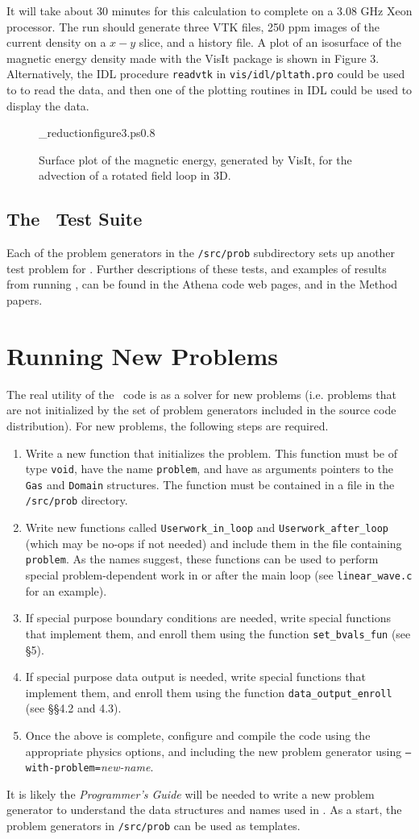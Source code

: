 It will take about 30 minutes for this calculation to complete on a 3.08 GHz
Xeon processor.  The run should generate three VTK files, 250 ppm
images of the current density on a $x-y$ slice, and a history file.
A plot of an isosurface
 of the magnetic energy density made with the VisIt package is
shown in Figure 3.  Alternatively, the IDL procedure {\tt readvtk}
in {\tt vis/idl/pltath.pro} could be used to to read the data, and then one
of the plotting routines in IDL could be used to display the data.

\begin{figure}[htb!]
\plotone_reduction{figure3.ps}{0.8}
\caption{Surface plot of the magnetic energy, generated by VisIt, for
the advection of a rotated field loop in 3D.}
\end{figure}

\subsection{The \ath\ Test Suite}

Each of the problem generators in the {\tt /src/prob} subdirectory sets
up another test problem for \ath.  Further descriptions of these tests, and
examples of results from running \ath, can be found in the Athena code 
web pages, and in the Method papers.
  
\section{Running New Problems}

The real utility of the \ath\ code is as a solver for new problems
(i.e. problems that
are not initialized by the set of problem generators included in the source
code distribution).  For new problems, the following steps are required.
\begin{enumerate}
\item Write a new function that initializes the problem.  This function must
be of type {\tt void}, have the name {\tt problem}, and have as arguments
pointers to the {\tt Gas} and {\tt Domain} structures.
The function must be contained in a file in the {\tt /src/prob} directory.
\item Write new functions called {\tt Userwork\_in\_loop} and 
{\tt Userwork\_after\_loop} (which may be no-ops if not needed) and include
them in the file containing {\tt problem}.  As the names suggest, these
functions can be used to perform special problem-dependent work in or 
after the main loop (see {\tt linear\_wave.c} for an example).
\item If special purpose boundary conditions are needed, write special
functions that implement them, and enroll them using the function
{\tt set\_bvals\_fun} (see \S 5).
\item If special purpose data output is needed, write special
functions that implement them, and enroll them using the function
{\tt data\_output\_enroll} (see \S\S 4.2 and 4.3).
\item Once the above is complete, configure and compile the code
using the appropriate physics options, and including the new problem
generator using {\tt --with-problem=}{\em new-name}.
\end{enumerate}

It is likely the {\em Programmer's Guide} will be needed to write a 
new problem generator to understand the data structures and names used
in \ath.  As a start, the problem generators in {\tt /src/prob} can be used
as templates.


